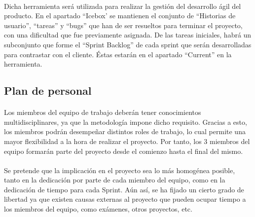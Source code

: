 \documentclass{article}
\begin{document}
        \paragraph{} 
        Dicha herramienta será utilizada para realizar la gestión del desarrollo ágil del producto. En el apartado ``Icebox' se mantienen el conjunto de ``Historias de usuario'', ``tareas'' y ``bugs'' que han de ser resueltos para terminar el proyecto, con una dificultad que fue previamente asignada. De las tareas iniciales, habrá un subconjunto que forme el ``Sprint Backlog'' de cada sprint que serán desarrolladas para contrastar con el cliente. Éstas estarán en el apartado ``Current'' en la herramienta. 

       	\subsection{Plan de personal}
			
            \paragraph{}
            Los miembros del equipo de trabajo deberán tener conocimientos multidisciplinares, ya que la metodología impone dicho requisito. Gracias a esto, los miembros podrán desempeñar distintos roles de trabajo, lo cual permite una mayor flexibilidad a la hora de realizar el proyecto. Por tanto, los 3 miembros del equipo formarán parte del proyecto desde el comienzo hasta el final del mismo.
                    
            \paragraph{}
			Se pretende que la implicación en el proyecto sea lo más homogénea posible, tanto en la dedicación por parte de cada miembro del equipo, como en la dedicación de tiempo para cada Sprint. Aún así, se ha fijado un cierto grado de libertad ya que existen causas externas al proyecto que pueden ocupar tiempo a los miembros del equipo, como exámenes, otros proyectos, etc.
\end{document}
